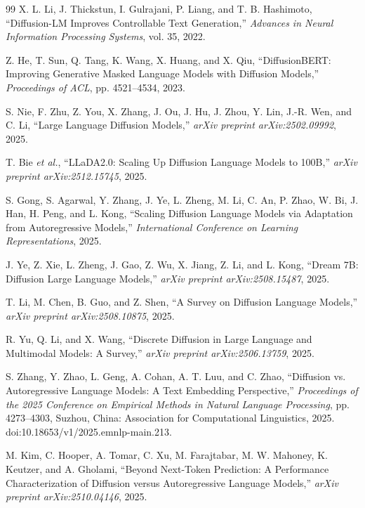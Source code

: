 \documentclass[12pt,a4paper,american,oneside]{scrartcl}
\begin{document}
\begin{thebibliography}{99}
X. L. Li, J. Thickstun, I. Gulrajani, P. Liang, and T. B. Hashimoto,
``Diffusion-LM Improves Controllable Text Generation,''
\emph{Advances in Neural Information Processing Systems}, vol. 35, 2022.

Z. He, T. Sun, Q. Tang, K. Wang, X. Huang, and X. Qiu,
``DiffusionBERT: Improving Generative Masked Language Models with Diffusion Models,''
\emph{Proceedings of ACL}, pp. 4521--4534, 2023.

S. Nie, F. Zhu, Z. You, X. Zhang, J. Ou, J. Hu, J. Zhou, Y. Lin, J.-R. Wen, and C. Li,
``Large Language Diffusion Models,''
\emph{arXiv preprint arXiv:2502.09992}, 2025.

T. Bie \emph{et al.},
``LLaDA2.0: Scaling Up Diffusion Language Models to 100B,''
\emph{arXiv preprint arXiv:2512.15745}, 2025.

S. Gong, S. Agarwal, Y. Zhang, J. Ye, L. Zheng, M. Li, C. An, P. Zhao, W. Bi, J. Han, H. Peng, and L. Kong,
``Scaling Diffusion Language Models via Adaptation from Autoregressive Models,''
\emph{International Conference on Learning Representations}, 2025.

J. Ye, Z. Xie, L. Zheng, J. Gao, Z. Wu, X. Jiang, Z. Li, and L. Kong,
``Dream 7B: Diffusion Large Language Models,''
\emph{arXiv preprint arXiv:2508.15487}, 2025.

T. Li, M. Chen, B. Guo, and Z. Shen,
``A Survey on Diffusion Language Models,''
\emph{arXiv preprint arXiv:2508.10875}, 2025.

R. Yu, Q. Li, and X. Wang,
``Discrete Diffusion in Large Language and Multimodal Models: A Survey,''
\emph{arXiv preprint arXiv:2506.13759}, 2025.

S. Zhang, Y. Zhao, L. Geng, A. Cohan, A. T. Luu, and C. Zhao,
``Diffusion vs. Autoregressive Language Models: A Text Embedding Perspective,''
\emph{Proceedings of the 2025 Conference on Empirical Methods in Natural Language Processing}, pp. 4273--4303, Suzhou, China: Association for Computational Linguistics, 2025. doi:10.18653/v1/2025.emnlp-main.213.

M. Kim, C. Hooper, A. Tomar, C. Xu, M. Farajtabar, M. W. Mahoney, K. Keutzer, and A. Gholami,
``Beyond Next-Token Prediction: A Performance Characterization of Diffusion versus Autoregressive Language Models,''
\emph{arXiv preprint arXiv:2510.04146}, 2025.


\end{thebibliography}
\end{document}
